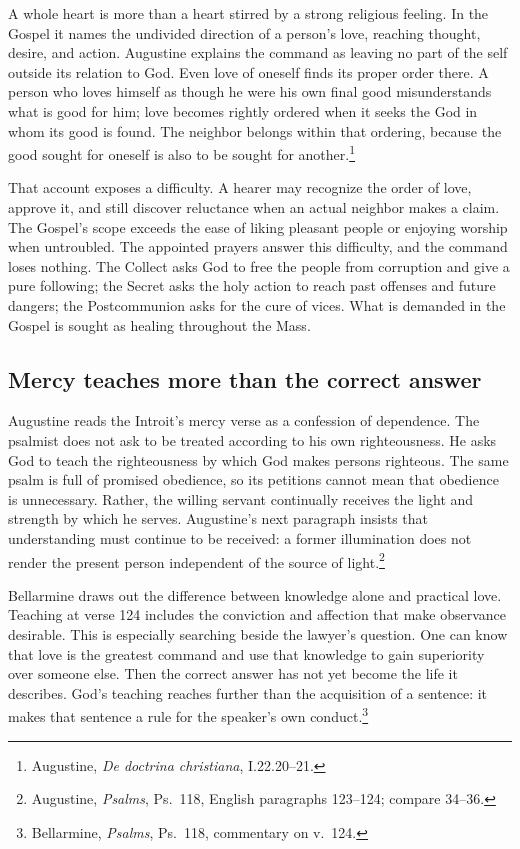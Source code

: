 
A whole heart is more than a heart stirred by a strong religious feeling. In the Gospel it names the undivided direction of a person's love, reaching thought, desire, and action. Augustine explains the command as leaving no part of the self outside its relation to God. Even love of oneself finds its proper order there. A person who loves himself as though he were his own final good misunderstands what is good for him; love becomes rightly ordered when it seeks the God in whom its good is found. The neighbor belongs within that ordering, because the good sought for oneself is also to be sought for another.\footnote{Augustine, \textit{De doctrina christiana}, I.22.20--21.}

That account exposes a difficulty. A hearer may recognize the order of love, approve it, and still discover reluctance when an actual neighbor makes a claim. The Gospel's scope exceeds the ease of liking pleasant people or enjoying worship when untroubled. The appointed prayers answer this difficulty, and the command loses nothing. The Collect asks God to free the people from corruption and give a pure following; the Secret asks the holy action to reach past offenses and future dangers; the Postcommunion asks for the cure of vices. What is demanded in the Gospel is sought as healing throughout the Mass.

\subsection{Mercy teaches more than the correct answer}
Augustine reads the Introit's mercy verse as a confession of dependence. The psalmist does not ask to be treated according to his own righteousness. He asks God to teach the righteousness by which God makes persons righteous. The same psalm is full of promised obedience, so its petitions cannot mean that obedience is unnecessary. Rather, the willing servant continually receives the light and strength by which he serves. Augustine's next paragraph insists that understanding must continue to be received: a former illumination does not render the present person independent of the source of light.\footnote{Augustine, \textit{Psalms}, Ps.~118, English paragraphs 123--124; compare 34--36.}

Bellarmine draws out the difference between knowledge alone and practical love. Teaching at verse 124 includes the conviction and affection that make observance desirable. This is especially searching beside the lawyer's question. One can know that love is the greatest command and use that knowledge to gain superiority over someone else. Then the correct answer has not yet become the life it describes. God's teaching reaches further than the acquisition of a sentence: it makes that sentence a rule for the speaker's own conduct.\footnote{Bellarmine, \textit{Psalms}, Ps.~118, commentary on v.~124.}

